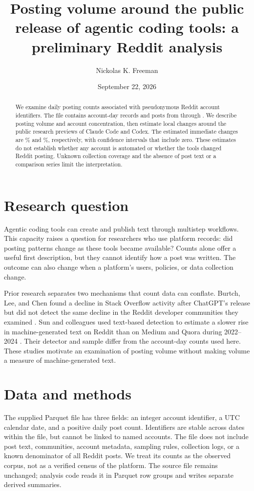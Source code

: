 \documentclass[11pt]{article}
\title{Posting volume around the public release of agentic coding tools: a preliminary Reddit analysis}
\author{Nickolas K. Freeman}
\date{September 22, 2026}
\begin{document}
\maketitle

\begin{abstract}
We examine daily posting counts associated with pseudonymous Reddit account identifiers. The file contains \dataUserDays{} account-day records and \dataPosts{} posts from \dataFirstDate{} through \dataLastRawDate{}. We describe posting volume and account concentration, then estimate local changes around the public research previews of Claude Code and Codex. The estimated immediate changes are \claudeChange\% and \codexChange\%, respectively, with confidence intervals that include zero. These estimates do not establish whether any account is automated or whether the tools changed Reddit posting. Unknown collection coverage and the absence of post text or a comparison series limit the interpretation.
\end{abstract}

\section{Research question}
Agentic coding tools can create and publish text through multistep workflows. This capacity raises a question for researchers who use platform records: did posting patterns change as these tools became available? Counts alone offer a useful first description, but they cannot identify how a post was written. The outcome can also change when a platform's users, policies, or data collection change.

Prior research separates two mechanisms that count data can conflate. Burtch, Lee, and Chen found a decline in Stack Overflow activity after ChatGPT's release but did not detect the same decline in the Reddit developer communities they examined \cite{burtch2024}. Sun and colleagues used text-based detection to estimate a slower rise in machine-generated text on Reddit than on Medium and Quora during 2022--2024 \cite{sun2025}. Their detector and sample differ from the account-day counts used here. These studies motivate an examination of posting volume without making volume a measure of machine-generated text.

\section{Data and methods}
The supplied Parquet file has three fields: an integer account identifier, a UTC calendar date, and a positive daily post count. Identifiers are stable across dates within the file, but cannot be linked to named accounts. The file does not include post text, communities, account metadata, sampling rules, collection logs, or a known denominator of all Reddit posts. We treat its counts as the observed corpus, not as a verified census of the platform. The source file remains unchanged; analysis code reads it in Parquet row groups and writes separate derived summaries.
\end{document}
